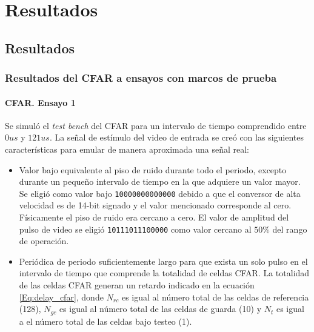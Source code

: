 
\chapter{Resultados} %

\label{Chapter4} %


\section{Resultados}
\label{sec: Resultados}

\subsection{Resultados del CFAR a ensayos con marcos de prueba}

\subsubsection{CFAR. Ensayo 1}
\label{Subsec:CFAR. Ensayo 1}

Se simuló el \textit{test bench} del CFAR para un intervalo de tiempo comprendido entre $0 us$ y $121 us$. La señal de estímulo del video de entrada se creó con las siguientes características para emular de manera aproximada una señal real:

\begin{itemize}
\item
Valor bajo equivalente al piso de ruido durante todo el periodo, excepto durante un pequeño intervalo de tiempo en la que adquiere un valor mayor. Se eligió como valor bajo \texttt{10000000000000} debido a que el conversor de alta velocidad es de 14-bit signado y el valor mencionado corresponde al cero. Físicamente el piso de ruido era cercano a cero. El valor de amplitud del pulso de video se eligió \texttt{10111011100000} como valor cercano al $50\%$ del rango de operación.


\item
Periódica de periodo suficientemente largo para que exista un solo pulso en el intervalo de tiempo que comprende la totalidad de celdas CFAR. La totalidad de las celdas CFAR generan un retardo indicado en la ecuación \ref{Eq:delay_cfar}, donde $N_{rc}$ es igual al número total de las celdas de referencia (128), $N_{gc}$ es igual al número total de las celdas de guarda (10) y $N_t$ es igual a el número total de las celdas bajo testeo (1).

\end{itemize}

